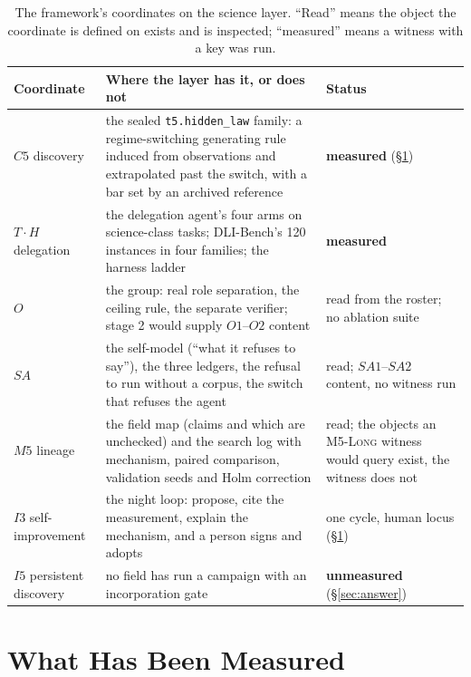 \documentclass[11pt]{article}
\theoremstyle{definition}
\begin{document}
\begin{table}[!htbp]
\centering\small
\begin{tabularx}{\textwidth}{@{}>{\raggedright\arraybackslash}p{2.6cm}Y>{\raggedright\arraybackslash}p{3.2cm}@{}}
\toprule
Coordinate & Where the layer has it, or does not & Status \\
\midrule
$C5$ discovery & the sealed \texttt{t5.hidden\_\allowbreak law} family: a regime-switching generating rule induced from observations and extrapolated past the switch, with a bar set by an archived reference & \textbf{measured} (\S\ref{sec:measured}) \\
$T\cdot H$ delegation & the delegation agent's four arms on science-class tasks; DLI-Bench's 120 instances in four families; the harness ladder & \textbf{measured} \\
$O$ & the group: real role separation, the ceiling rule, the separate verifier; stage 2 would supply $O1$--$O2$ content & read from the roster; no ablation suite \\
$SA$ & the self-model (``what it refuses to say''), the three ledgers, the refusal to run without a corpus, the switch that refuses the agent & read; $SA1$--$SA2$ content, no witness run \\
$M5$ lineage & the field map (claims and which are unchecked) and the search log with mechanism, paired comparison, validation seeds and Holm correction & read; the objects an \textsc{M5-Long} witness would query exist, the witness does not \\
$I3$ self-improvement & the night loop: propose, cite the measurement, explain the mechanism, and a person signs and adopts & one cycle, human locus (\S\ref{sec:measured}) \\
$I5$ persistent discovery & no field has run a campaign with an incorporation gate & \textbf{unmeasured} (\S\ref{sec:answer}) \\
\bottomrule
\end{tabularx}
\caption{The framework's coordinates on the science layer. ``Read'' means the object the coordinate is defined on exists and is inspected; ``measured'' means a witness with a key was run.}
\label{tab:coords}
\end{table}

\section{What Has Been Measured}\label{sec:measured}
\end{document}

